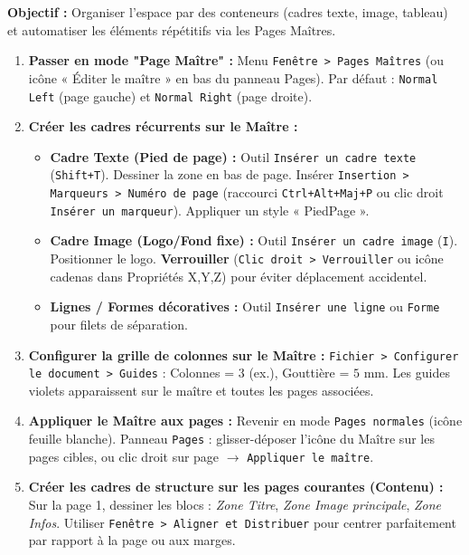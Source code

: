 \documentclass[11pt]{article}
\begin{document}
\begin{methode}
    \textbf{Objectif :} Organiser l'espace par des conteneurs (cadres texte, image, tableau) et automatiser les éléments répétitifs via les Pages Maîtres.
    \begin{enumerate}
        \item \textbf{Passer en mode "Page Maître" :} Menu \texttt{Fenêtre > Pages Maîtres} (ou icône « Éditer le maître » en bas du panneau Pages). Par défaut : \texttt{Normal Left} (page gauche) et \texttt{Normal Right} (page droite).
        \item \textbf{Créer les cadres récurrents sur le Maître :}
              \begin{itemize}
                  \item \textbf{Cadre Texte (Pied de page) :} Outil \texttt{Insérer un cadre texte} (\texttt{Shift+T}). Dessiner la zone en bas de page. Insérer \texttt{Insertion > Marqueurs > Numéro de page} (raccourci \texttt{Ctrl+Alt+Maj+P} ou clic droit \texttt{Insérer un marqueur}). Appliquer un style « PiedPage ».
                  \item \textbf{Cadre Image (Logo/Fond fixe) :} Outil \texttt{Insérer un cadre image} (\texttt{I}). Positionner le logo. \textbf{Verrouiller} (\texttt{Clic droit > Verrouiller} ou icône cadenas dans Propriétés X,Y,Z) pour éviter déplacement accidentel.
                  \item \textbf{Lignes / Formes décoratives :} Outil \texttt{Insérer une ligne} ou \texttt{Forme} pour filets de séparation.
              \end{itemize}
        \item \textbf{Configurer la grille de colonnes sur le Maître :} \texttt{Fichier > Configurer le document > Guides} : Colonnes = $3$ (ex.), Gouttière = $5$ mm. Les guides violets apparaissent sur le maître et toutes les pages associées.
        \item \textbf{Appliquer le Maître aux pages :} Revenir en mode \texttt{Pages normales} (icône feuille blanche). Panneau \texttt{Pages} : glisser-déposer l'icône du Maître sur les pages cibles, ou clic droit sur page $\rightarrow$ \texttt{Appliquer le maître}.
        \item \textbf{Créer les cadres de structure sur les pages courantes (Contenu) :} Sur la page 1, dessiner les blocs : \emph{Zone Titre}, \emph{Zone Image principale}, \emph{Zone Infos}. Utiliser \texttt{Fenêtre > Aligner et Distribuer} pour centrer parfaitement par rapport à la page ou aux marges.

\end{enumerate}
\end{methode}
\end{document}
